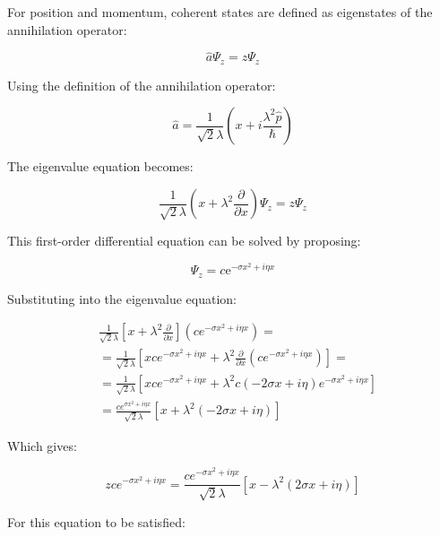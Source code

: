 \documentclass[italian]{HKNdocument}
\begin{document}
For position and momentum, coherent states are defined as eigenstates of the annihilation operator:

\begin{equation*}
\hat{a} \Psi_{z}=z \Psi_{z} \tag{7.46}
\end{equation*}

Using the definition of the annihilation operator:

\begin{equation*}
\hat{a}=\frac{1}{\sqrt{2} \lambda}\left(x+i \frac{\lambda^{2} \hat{p}}{\hbar}\right) \tag{7.47}
\end{equation*}

The eigenvalue equation becomes:

\begin{equation*}
\frac{1}{\sqrt{2} \lambda}\left(x+\lambda^{2} \frac{\partial}{\partial x}\right) \Psi_{z}=z \Psi_{z} \tag{7.48}
\end{equation*}

This first-order differential equation can be solved by proposing:

\begin{equation*}
\Psi_{z}=c \mathrm{e}^{-\sigma x^{2}+i \eta x} \tag{7.49}
\end{equation*}

Substituting into the eigenvalue equation:

\begin{align*}
& \frac{1}{\sqrt{2} \lambda}\left[x+\lambda^{2} \frac{\partial}{\partial x}\right]\left(c e^{-\sigma x^{2}+i \eta x}\right)= \\
& =\frac{1}{\sqrt{2} \lambda}\left[x c e^{-\sigma x^{2}+i \eta x}+\lambda^{2} \frac{\partial}{\partial x}\left(c e^{-\sigma x^{2}+i \eta x}\right)\right]= \\
& =\frac{1}{\sqrt{2} \lambda}\left[x c e^{-\sigma x^{2}+i \eta x}+\lambda^{2} c(-2 \sigma x+i \eta) e^{-\sigma x^{2}+i \eta x}\right]  \tag{7.50}\\
& =\frac{c e^{\sigma x^{2}+i \eta x}}{\sqrt{2} \lambda}\left[x+\lambda^{2}(-2 \sigma x+i \eta)\right]
\end{align*}

Which gives:

\begin{equation*}
z c e^{-\sigma x^{2}+i \eta x}=\frac{c e^{-\sigma x^{2}+i \eta x}}{\sqrt{2} \lambda}\left[x-\lambda^{2}(2 \sigma x+i \eta)\right] \tag{7.51}
\end{equation*}

For this equation to be satisfied:
\end{document}
